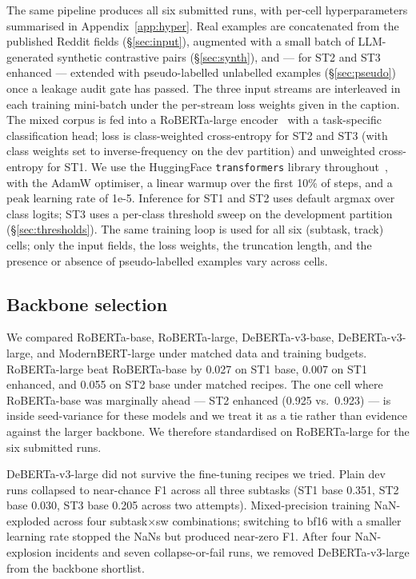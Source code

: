 The same pipeline produces all six submitted runs, with per-cell hyperparameters summarised in Appendix~\ref{app:hyper}. Real examples are concatenated from the published Reddit fields (\S\ref{sec:input}), augmented with a small batch of LLM-generated synthetic contrastive pairs (\S\ref{sec:synth}), and --- for ST2 and ST3 enhanced --- extended with pseudo-labelled unlabelled examples (\S\ref{sec:pseudo}) once a leakage audit gate has passed. The three input streams are interleaved in each training mini-batch under the per-stream loss weights given in the caption. The mixed corpus is fed into a RoBERTa-large encoder~\cite{liu2019roberta} with a task-specific classification head; loss is class-weighted cross-entropy for ST2 and ST3 (with class weights set to inverse-frequency on the dev partition) and unweighted cross-entropy for ST1. We use the HuggingFace \texttt{transformers} library throughout~\cite{wolf2020transformers}, with the AdamW optimiser, a linear warmup over the first 10\% of steps, and a peak learning rate of 1e-5. Inference for ST1 and ST2 uses default argmax over class logits; ST3 uses a per-class threshold sweep on the development partition (\S\ref{sec:thresholds}). The same training loop is used for all six (subtask, track) cells; only the input fields, the loss weights, the truncation length, and the presence or absence of pseudo-labelled examples vary across cells.

\subsection{Backbone selection}
\label{sec:backbone}

We compared RoBERTa-base, RoBERTa-large, DeBERTa-v3-base, DeBERTa-v3-large, and ModernBERT-large under matched data and training budgets. RoBERTa-large beat RoBERTa-base by 0.027 on ST1 base, 0.007 on ST1 enhanced, and 0.055 on ST2 base under matched recipes. %
The one cell where RoBERTa-base was marginally ahead --- ST2 enhanced (0.925 vs.\ 0.923) --- is inside seed-variance for these models and we treat it as a tie rather than evidence against the larger backbone. %
We therefore standardised on RoBERTa-large for the six submitted runs.

DeBERTa-v3-large did not survive the fine-tuning recipes we tried. Plain dev runs collapsed to near-chance F1 across all three subtasks (ST1 base 0.351, ST2 base 0.030, ST3 base 0.205 across two attempts). %
Mixed-precision training NaN-exploded across four subtask$\times$sw combinations; switching to bf16 with a smaller learning rate stopped the NaNs but produced near-zero F1. %
After four NaN-explosion incidents and seven collapse-or-fail runs, we removed DeBERTa-v3-large from the backbone shortlist.

